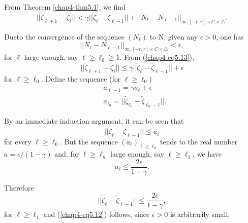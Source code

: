 From Theorem \ref{chap4-thm5.1}, we find
\begin{equation*}
||\widetilde{\zeta}_{\ell + 1} - \widetilde{\zeta}_{\ell}|| < \gamma
||\widetilde{\zeta}_{\ell} - \widetilde{\zeta}_{\ell - 1}|| +
||N_{\ell} - N_{\ell - 1}||_{\infty, [-r, r] \times C \times
\triangle}.\tag{5.13}\label{chap4-eq5.13} 
\end{equation*}

Due\pageoriginale to the convergence of the sequence $(N_{\ell})$ to
N, given any $\epsilon > 0$, one has
$$
||N_{\ell} - N_{\ell - 1}||_{\infty, [-r, r] \times C \times
  \triangle} < \epsilon,
$$ 
for $\ell$ large enough, say $\ell \geq \ell_{0} \geq 1$. From
(\ref{chap4-eq5.13}),
$$
||\widetilde{\zeta}_{\ell + 1} - \widetilde{\zeta}_{\ell}|| \leq
\gamma||\widetilde{\zeta}_{\ell} - \widetilde{\zeta}_{\ell - 1}|| + \epsilon
$$
for $\ell \geq \ell_{0}$. Define the sequence (for $\ell \geq
\ell_{0}$)
\begin{align*}
& a_{\ell + 1} = \gamma a_{\ell} + \epsilon\\
& a_{\ell_{0}} = ||\widetilde{\zeta}_{\ell_{0}} -
  \widetilde{\zeta}_{\ell_{0} - 1}||.
\end{align*}

By an immediate induction argument, it can be seen that
$$
||\widetilde{\zeta}_{\ell} - \widetilde{\zeta}_{\ell - 1}|| \leq a_{\ell}
$$
for every $\ell \geq \ell_{0}$. But the sequence $(a_{\ell})_{\ell
  \geq \ell_{0}}$ tends to the real number $a = \epsilon/(1 - \gamma)$
and, for $\ell \geq \ell_{n}$ large enough, say $\ell \geq \ell_{1}$,
we have
$$
a_{\ell} \leq \frac{2\epsilon}{1 - \gamma}.
$$

Therefore
$$
||\widetilde{\zeta}_{\ell} - \widetilde{\zeta}_{\ell-1}|| \leq
\frac{2\epsilon}{1 - \gamma},
$$
for $\ell \geq \ell_{1}$ and (\ref{chap4-eq5.12}) follows, since
$\epsilon > 0$ is arbitrarily small.

